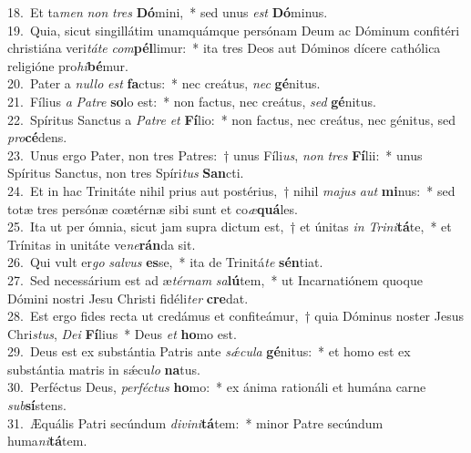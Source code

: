 {18.~}Et ta\textit{men} \textit{non} \textit{tres} \textbf{Dó}mini,~* sed unus \textit{est} \textbf{Dó}minus.\\
{19.~}Quia, sicut singillátim unamquámque persónam Deum ac Dóminum confitéri christiána veri\textit{tá}\textit{te} \textit{com}\textbf{pél}limur:~* ita tres Deos aut Dóminos dícere cathólica religióne pro\textit{hi}\textbf{bé}mur.\\
{20.~}Pater a \textit{nul}\textit{lo} \textit{est} \textbf{fa}ctus:~* nec creátus, \textit{nec} \textbf{gé}nitus.\\
{21.~}Fílius \textit{a} \textit{Pa}\textit{tre} \textbf{so}lo est:~* non factus, nec creátus, \textit{sed} \textbf{gé}nitus.\\
{22.~}Spíritus Sanctus a \textit{Pa}\textit{tre} \textit{et} \textbf{Fí}lio:~* non factus, nec creátus, nec génitus, sed \textit{pro}\textbf{cé}dens.\\
{23.~}Unus ergo Pater, non tres Patres:~† unus Fíli\textit{us}, \textit{non} \textit{tres} \textbf{Fí}lii:~* unus Spíritus Sanctus, non tres Spíri\textit{tus} \textbf{San}cti.\\
{24.~}Et in hac Trinitáte nihil prius aut postérius,~† nihil \textit{ma}\textit{jus} \textit{aut} \textbf{mi}nus:~* sed totæ tres persónæ coætérnæ sibi sunt et co\textit{æ}\textbf{quá}les.\\
{25.~}Ita ut per ómnia, sicut jam supra dictum est,~† et únitas \textit{in} \textit{Tri}\textit{ni}\textbf{tá}te,~* et Trínitas in unitáte ve\textit{ne}\textbf{rán}da sit.\\
{26.~}Qui vult er\textit{go} \textit{sal}\textit{vus} \textbf{es}se,~* ita de Trinitá\textit{te} \textbf{sén}tiat.\\
{27.~}Sed necessárium est ad æ\textit{tér}\textit{nam} \textit{sa}\textbf{lú}tem,~* ut Incarnatiónem quoque Dómini nostri Jesu Christi fidéli\textit{ter} \textbf{cre}dat.\\
{28.~}Est ergo fides recta ut credámus et confiteámur,~† quia Dóminus noster Jesus Chri\textit{stus}, \textit{De}\textit{i} \textbf{Fí}lius~* Deus \textit{et} \textbf{ho}mo est.\\
{29.~}Deus est ex substántia Patris ante \textit{sǽ}\textit{cu}\textit{la} \textbf{gé}nitus:~* et homo est ex substántia matris in sǽcu\textit{lo} \textbf{na}tus.\\
{30.~}Perféctus Deus, \textit{per}\textit{fé}\textit{ctus} \textbf{ho}mo:~* ex ánima rationáli et humána carne \textit{sub}\textbf{sí}stens.\\
{31.~}Æquális Patri secúndum \textit{di}\textit{vi}\textit{ni}\textbf{tá}tem:~* minor Patre secúndum huma\textit{ni}\textbf{tá}tem.\\
